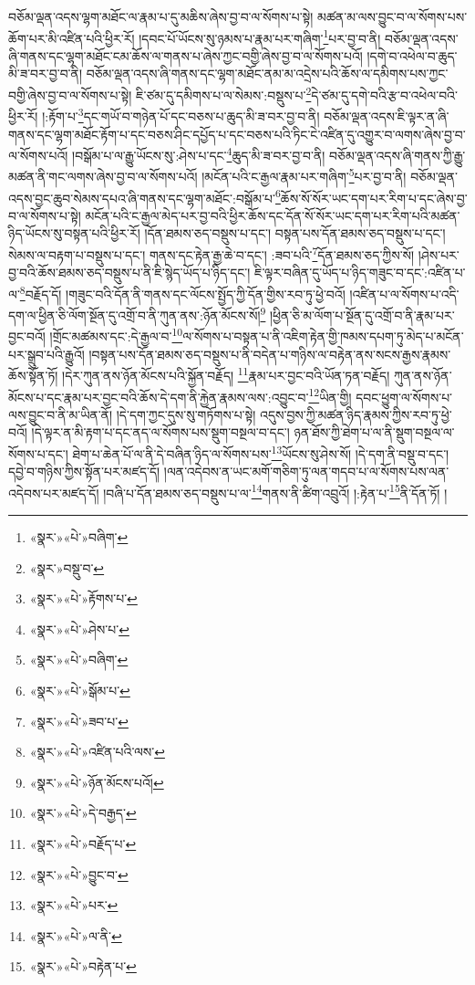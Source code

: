 བཅོམ་ལྡན་འདས་ལྷག་མཐོང་ལ་རྣམ་པ་དུ་མཆིས་ཞེས་བྱ་བ་ལ་སོགས་པ་སྟེ། མཚན་མ་ལས་བྱུང་བ་ལ་སོགས་པས་ཆོག་པར་མི་འཛིན་པའི་ཕྱིར་རོ། །དབང་པོ་ཡོངས་སུ་ཉམས་པ་རྣམ་པར་གཞིག་\footnote{«སྣར་»«པེ་»བཞིག་}པར་བྱ་བ་ནི། བཅོམ་ལྡན་འདས་ཞི་གནས་དང་ལྷག་མཐོང་ངམ་ཆོས་ལ་གནས་པ་ཞེས་ཀྱང་བགྱི་ཞེས་བྱ་བ་ལ་སོགས་པའོ། །དགེ་བ་འཕེལ་བ་ཆུད་མི་ཟ་བར་བྱ་བ་ནི། བཅོམ་ལྡན་འདས་ཞི་གནས་དང་ལྷག་མཐོང་ནམ་མ་འདྲེས་པའི་ཆོས་ལ་དམིགས་པས་ཀྱང་བགྱི་ཞེས་བྱ་བ་ལ་སོགས་པ་སྟེ། ཇི་ཙམ་དུ་དམིགས་པ་ལ་སེམས་:བསྡུས་པ་\footnote{«སྣར་»བསྡུ་བ་}དེ་ཙམ་དུ་དགེ་བའི་རྩ་བ་འཕེལ་བའི་ཕྱིར་རོ། །:རྟོག་པ་\footnote{«སྣར་»«པེ་»རྟོགས་པ་}དང་གཡོ་བ་གཉེན་པོ་དང་བཅས་པ་ཆུད་མི་ཟ་བར་བྱ་བ་ནི། བཅོམ་ལྡན་འདས་ཇི་ལྟར་ན་ཞི་གནས་དང་ལྷག་མཐོང་རྟོག་པ་དང་བཅས་ཤིང་དཔྱོད་པ་དང་བཅས་པའི་ཏིང་ངེ་འཛིན་དུ་འགྱུར་བ་ལགས་ཞེས་བྱ་བ་ལ་སོགས་པའོ། །བསྒོམ་པ་ལ་རྒྱུ་ཡོངས་སུ་:ཤེས་པ་དང་\footnote{«སྣར་»«པེ་»ཤེས་པ་}ཆུད་མི་ཟ་བར་བྱ་བ་ནི། བཅོམ་ལྡན་འདས་ཞི་གནས་ཀྱི་རྒྱུ་མཚན་ནི་གང་ལགས་ཞེས་བྱ་བ་ལ་སོགས་པའོ། །མངོན་པའི་ང་རྒྱལ་རྣམ་པར་གཞིག་\footnote{«སྣར་»«པེ་»བཞིག་}པར་བྱ་བ་ནི། བཅོམ་ལྡན་འདས་བྱང་ཆུབ་སེམས་དཔའ་ཞི་གནས་དང་ལྷག་མཐོང་:བསྒོམ་པ་\footnote{«སྣར་»«པེ་»སྒོམ་པ་}ཆོས་སོ་སོར་ཡང་དག་པར་རིག་པ་དང་ཞེས་བྱ་བ་ལ་སོགས་པ་སྟེ། མངོན་པའི་ང་རྒྱལ་མེད་པར་བྱ་བའི་ཕྱིར་ཆོས་དང་དོན་སོ་སོར་ཡང་དག་པར་རིག་པའི་མཚན་ཉིད་ཡོངས་སུ་བསྟན་པའི་ཕྱིར་རོ། །དོན་ཐམས་ཅད་བསྡུས་པ་དང་། བསྟན་པས་དོན་ཐམས་ཅད་བསྡུས་པ་དང་། སེམས་ལ་བརྟག་པ་བསྡུས་པ་དང་། གནས་དང་རྟེན་རྒྱ་ཆེ་བ་དང་། :ཟབ་པའི་\footnote{«སྣར་»«པེ་»ཟབ་པ་}དོན་ཐམས་ཅད་ཀྱིས་སོ། །ཤེས་པར་བྱ་བའི་ཆོས་ཐམས་ཅད་བསྡུས་པ་ནི་ཇི་སྙེད་ཡོད་པ་ཉིད་དང་། ཇི་ལྟར་བཞིན་དུ་ཡོད་པ་ཉིད་གཟུང་བ་དང་:འཛིན་པ་ལ་\footnote{«སྣར་»«པེ་»འཛིན་པའི་ལས་}བརྗོད་དོ། །གཟུང་བའི་དོན་ནི་གནས་དང་ལོངས་སྤྱོད་ཀྱི་དོན་གྱིས་རབ་ཏུ་ཕྱེ་བའོ། །འཛིན་པ་ལ་སོགས་པ་འདི་དག་ལ་ཕྱིན་ཅི་ལོག་སྔོན་དུ་འགྲོ་བ་ནི་ཀུན་ནས་:ཉོན་མོངས་སོ།\footnote{«སྣར་»«པེ་»ཉོན་མོངས་པའོ།} །ཕྱིན་ཅི་མ་ལོག་པ་སྔོན་དུ་འགྲོ་བ་ནི་རྣམ་པར་བྱང་བའོ། །གྲོང་མཚམས་དང་:དེ་རྒྱལ་བ་\footnote{«སྣར་»«པེ་»དེ་བརྒྱད་}ལ་སོགས་པ་བསྟན་པ་ནི་འཇིག་རྟེན་གྱི་ཁམས་དཔག་ཏུ་མེད་པ་མངོན་པར་སྒྲུབ་པའི་རྒྱུའོ། །བསྟན་པས་དོན་ཐམས་ཅད་བསྡུས་པ་ནི་བདེན་པ་གཉིས་ལ་བརྟེན་ནས་སངས་རྒྱས་རྣམས་ཆོས་སྟོན་ཏོ། །དེར་ཀུན་ནས་ཉོན་མོངས་པའི་སྐྱོན་བརྗོད། \footnote{«སྣར་»«པེ་»བརྗོད་པ་}རྣམ་པར་བྱང་བའི་ཡོན་ཏན་བརྗོད། ཀུན་ནས་ཉོན་མོངས་པ་དང་རྣམ་པར་བྱང་བའི་ཆོས་དེ་དག་ནི་རྐྱེན་རྣམས་ལས་:འབྱུང་བ་\footnote{«སྣར་»«པེ་»བྱུང་བ་}ཡིན་གྱི། དབང་ཕྱུག་ལ་སོགས་པ་ལས་བྱུང་བ་ནི་མ་ཡིན་ནོ། །དེ་དག་ཀྱང་དུས་སུ་གཏོགས་པ་སྟེ། འདུས་བྱས་ཀྱི་མཚན་ཉིད་རྣམས་ཀྱིས་རབ་ཏུ་ཕྱེ་བའོ། །དེ་ལྟར་ན་མི་རྟག་པ་དང་ནད་ལ་སོགས་པས་སྡུག་བསྔལ་བ་དང་། ཉན་ཐོས་ཀྱི་ཐེག་པ་ལ་ནི་སྡུག་བསྔལ་ལ་སོགས་པ་དང་། ཐེག་པ་ཆེན་པོ་ལ་ནི་དེ་བཞིན་ཉིད་ལ་སོགས་པས་\footnote{«སྣར་»«པེ་»པར་}ཡོངས་སུ་ཤེས་སོ། །དེ་དག་ནི་བསྡུ་བ་དང་། དབྱེ་བ་གཉིས་ཀྱིས་སྟོན་པར་མཛད་དོ། །ལན་འདེབས་ན་ཡང་མགོ་གཅིག་ཏུ་ལན་གདབ་པ་ལ་སོགས་པས་ལན་འདེབས་པར་མཛད་དོ། །བཞི་པ་དོན་ཐམས་ཅད་བསྡུས་པ་ལ་\footnote{«སྣར་»«པེ་»ལ་ནི་}གནས་ནི་ཚིག་འབྲུའོ། །:རྟེན་པ་\footnote{«སྣར་»«པེ་»བརྟེན་པ་}ནི་དོན་ཏོ། །
